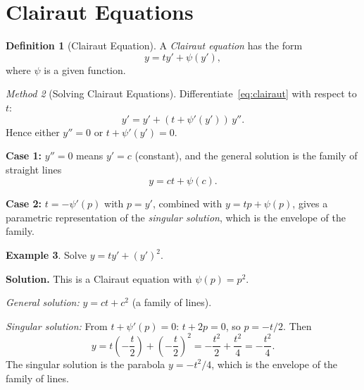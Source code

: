 \documentclass[12pt,a4paper,openany]{book}
\theoremstyle{definition}
\newtheorem{definition}{Definition}[chapter]
\newtheorem{example}[definition]{Example}
\theoremstyle{plain}
\theoremstyle{remark}
\newtheorem{method}[definition]{Method}
\begin{document}
\section{Clairaut Equations}
\label{sec:clairaut}

\begin{definition}[Clairaut Equation]
\label{def:clairaut}
A \emph{Clairaut equation} has the form
\begin{equation}\label{eq:clairaut}
  y = ty' + \psi(y'),
\end{equation}
where $\psi$ is a given function.
\end{definition}

\begin{method}[Solving Clairaut Equations]
\label{meth:clairaut}
Differentiate~\eqref{eq:clairaut} with respect to $t$:
\[
  y' = y' + (t + \psi'(y'))\,y''.
\]
Hence either $y'' = 0$ or $t + \psi'(y') = 0$.

\textbf{Case 1:} $y'' = 0$ means $y' = c$ (constant), and the general solution is the family of straight lines
\[
  y = ct + \psi(c).
\]

\textbf{Case 2:} $t = -\psi'(p)$ with $p = y'$, combined with $y = tp + \psi(p)$, gives a parametric representation of the \emph{singular solution}, which is the envelope of the family.
\end{method}

\begin{example}
\label{ex:clairaut-1}
Solve $y = ty' + (y')^2$.

\textbf{Solution.} This is a Clairaut equation with $\psi(p) = p^2$.

\textit{General solution:} $y = ct + c^2$ (a family of lines).

\textit{Singular solution:} From $t + \psi'(p) = 0$: $t + 2p = 0$, so $p = -t/2$. Then
\[
  y = t\!\left(-\frac{t}{2}\right) + \left(-\frac{t}{2}\right)^2 = -\frac{t^2}{2} + \frac{t^2}{4} = -\frac{t^2}{4}.
\]
The singular solution is the parabola $y = -t^2/4$, which is the envelope of the family of lines.
\end{example}

\begin{center}
\end{center}
\end{document}

